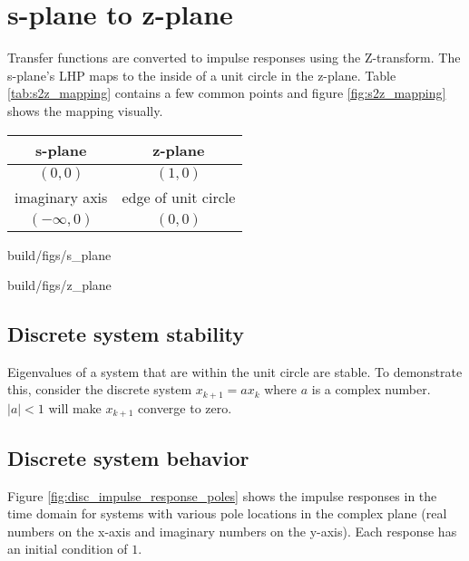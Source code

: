 \section{s-plane to z-plane}

Transfer functions are converted to impulse responses using the Z-transform. The
s-plane's LHP maps to the inside of a unit circle in the z-plane. Table
\ref{tab:s2z_mapping} contains a few common points and figure
\ref{fig:s2z_mapping} shows the mapping visually.
\begin{booktable}
  \begin{tabular}{|cc|}
    \hline
    \rowcolor{headingbg}
    \textbf{s-plane} & \textbf{z-plane} \\
    \hline
    $(0, 0)$ & $(1, 0)$ \\
    imaginary axis & edge of unit circle \\
    $(-\infty, 0)$ & $(0, 0)$ \\
    \hline
  \end{tabular}
  \caption{Mapping from s-plane to z-plane}
  \label{tab:s2z_mapping}
\end{booktable}
\begin{bookfigure}
  \begin{minisvg}{2}{build/figs/s_plane}
  \end{minisvg}
  \hfill
  \begin{minisvg}{2}{build/figs/z_plane}
  \end{minisvg}
  \caption{Mapping of complex plane from s-plane (left) to z-plane (right)}
  \label{fig:s2z_mapping}
\end{bookfigure}

\subsection{Discrete system stability}

Eigenvalues of a \gls{system} that are within the unit circle are stable. To
demonstrate this, consider the discrete system $x_{k + 1} = ax_k$ where $a$ is a
complex number. $|a| < 1$ will make $x_{k + 1}$ converge to zero.

\subsection{Discrete system behavior}

Figure \ref{fig:disc_impulse_response_poles} shows the \glspl{impulse response}
in the time domain for \glspl{system} with various pole locations in the complex
plane (real numbers on the x-axis and imaginary numbers on the y-axis). Each
response has an initial condition of $1$.
\begin{bookfigure}
  
  \caption{Discrete impulse response vs pole location}
  \label{fig:disc_impulse_response_poles}
\end{bookfigure}

